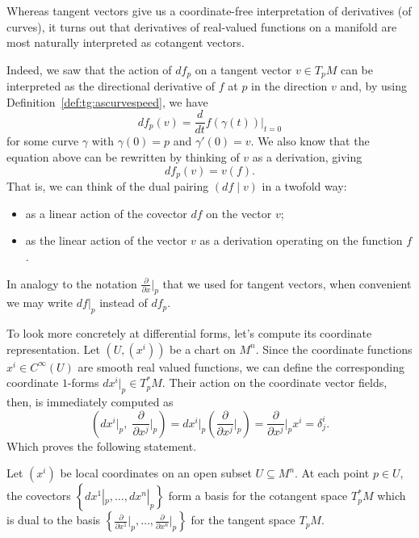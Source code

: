 Whereas tangent vectors give us a coordinate-free interpretation of derivatives (of curves), it turns out that derivatives of real-valued functions on a manifold are most naturally interpreted as cotangent vectors.

Indeed, we saw that the action of $df_p$ on a tangent vector $v\in T_p M$ can be interpreted as the directional derivative of $f$ at $p$ in the direction $v$ and, by using Definition~\ref{def:tg:ascurvespeed}, we have
\begin{equation}
  df_p(v) = \frac{d}{dt}f(\gamma(t))\Big|_{t=0}
\end{equation}
for some curve $\gamma$ with $\gamma(0) = p$ and $\gamma'(0)=v$.
We also know that the equation above can be rewritten by thinking of $v$ as a derivation, giving
\begin{equation}
  df_p(v) = v(f).
\end{equation}
That is, we can think of the dual pairing $(df\mid v)$ in a twofold way:
\begin{itemize}
  \item as a linear action of the covector $df$ on the vector $v$;
  \item as the linear action of the vector $v$ as a derivation operating on the function $f$.
\end{itemize}

\begin{notation}
  In analogy to the notation $\frac{\partial}{\partial x}\big|_p$ that we used for tangent vectors, when convenient we may write $df|_p$ instead of $df_p$.
\end{notation}

To look more concretely at differential forms, let's compute its coordinate representation.
Let $(U,(x^i))$ be a chart on $M^n$.
Since the coordinate functions $x^i\in C^\infty(U)$ are smooth real valued functions, we can define the corresponding coordinate $1$-forms $dx^i|_p \in T_p^* M$.
Their action on the coordinate vector fields, then, is immediately computed as
\begin{equation}
  \left(dx^i|_p ,\; \frac{\partial}{\partial x^j}\Big|_p\right) =
  dx^i|_p \left(\frac{\partial}{\partial x^j}\Big|_p\right)
  = \frac{\partial}{\partial x^j}\Big|_p x^i
  = \delta^i_j.
\end{equation}
Which proves the following statement.

\begin{proposition}
  Let $(x^i)$ be local coordinates on an open subset $U\subseteq M^n$.
  At each point $p\in U$, the covectors $\left\{dx^1|_p, \ldots, dx^n|_p\right\}$ form a basis for the cotangent space $T_p^* M$ which is dual to the basis $\left\{\frac{\partial}{\partial x^1}\Big|_p, \ldots, \frac{\partial}{\partial x^n}\Big|_p\right\}$ for the tangent space $T_p M$.
\end{proposition}

